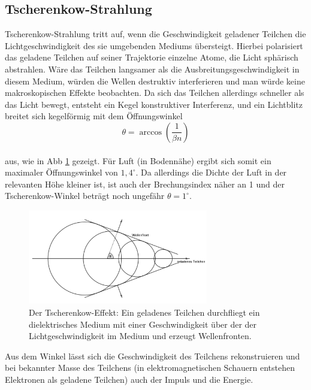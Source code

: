 \subsection{Tscherenkow-Strahlung}
Tscherenkow-Strahlung tritt auf, wenn die Geschwindigkeit geladener Teilchen die Lichtgeschwindigkeit des sie umgebenden Mediums übersteigt. Hierbei polarisiert das geladene Teilchen auf seiner Trajektorie einzelne Atome, die Licht sphärisch abstrahlen. Wäre das Teilchen langsamer als die Ausbreitungsgeschwindigkeit in diesem Medium, würden die Wellen destruktiv interferieren und man würde keine makroskopischen Effekte beobachten. Da sich das Teilchen allerdings schneller als das Licht bewegt, entsteht ein Kegel konstruktiver Interferenz, und ein Lichtblitz breitet sich kegelförmig mit dem Öffnungswinkel
\begin{equation}
\theta = \arccos\left(\frac{1}{\beta n}\right) \label{eq:cherenkow}
\end{equation}\\
aus, wie in Abb \ref{img:cherenkow} gezeigt. Für Luft (in Bodennähe) ergibt sich somit ein maximaler Öffnungswinkel von $1,4^{\circ}$\cite{Grupen}. Da allerdings die Dichte der Luft in der relevanten Höhe kleiner ist, ist auch der Brechungsindex näher an 1 und der Tscherenkow-Winkel beträgt noch ungefähr $\theta = 1^{\circ}$\cite{Grupen}.
\begin{figure}[htbp]
\centering
\includegraphics[width=0.7\textwidth]{Images/cherenkow.png}
\caption{Der Tscherenkow-Effekt: Ein geladenes Teilchen durchfliegt ein dielektrisches Medium mit einer Geschwindigkeit über der der Lichtgeschwindigkeit im Medium und erzeugt Wellenfronten.}
\label{img:cherenkow}
\end{figure}
Aus dem Winkel lässt sich die Geschwindigkeit des Teilchens rekonstruieren und bei bekannter Masse des Teilchens (in elektromagnetischen Schauern entstehen Elektronen als geladene Teilchen) auch der Impuls und die Energie.

